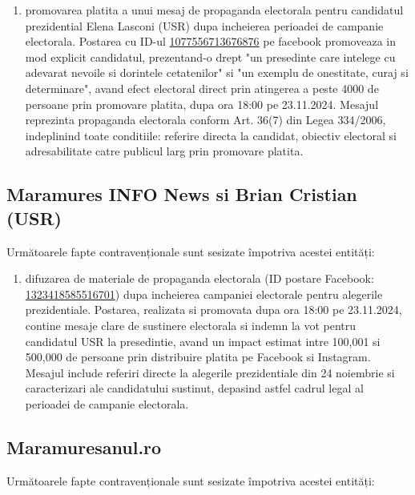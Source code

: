 \documentclass[a4paper,12pt]{article}
\begin{document}
\begin{enumerate}[leftmargin=*, label=\arabic*.)]
    \item promovarea platita a unui mesaj de propaganda electorala pentru candidatul prezidential Elena Lasconi (USR) dupa incheierea perioadei de campanie electorala. Postarea cu ID-ul \href{https://www.facebook.com/ads/library/?id=1077556713676876}{1077556713676876} pe facebook promoveaza in mod explicit candidatul, prezentand-o drept "un presedinte care intelege cu adevarat nevoile si dorintele cetatenilor" si "un exemplu de onestitate, curaj si determinare", avand efect electoral direct prin atingerea a peste 4000 de persoane prin promovare platita, dupa ora 18:00 pe 23.11.2024. Mesajul reprezinta propaganda electorala conform Art. 36(7) din Legea 334/2006, indeplinind toate conditiile: referire directa la candidat, obiectiv electoral si adresabilitate catre publicul larg prin promovare platita.
\end{enumerate}

\vspace{0.5cm}

\subsection{Maramures INFO News si Brian Cristian (USR)}
Următoarele fapte contravenționale sunt sesizate împotriva acestei entități:

\begin{enumerate}[leftmargin=*, label=\arabic*.)]
    \item difuzarea de materiale de propaganda electorala (ID postare Facebook: \href{https://www.facebook.com/ads/library/?id=1323418585516701}{1323418585516701}) dupa incheierea campaniei electorale pentru alegerile prezidentiale. Postarea, realizata si promovata dupa ora 18:00 pe 23.11.2024, contine mesaje clare de sustinere electorala si indemn la vot pentru candidatul USR la presedintie, avand un impact estimat intre 100,001 si 500,000 de persoane prin distribuire platita pe Facebook si Instagram. Mesajul include referiri directe la alegerile prezidentiale din 24 noiembrie si caracterizari ale candidatului sustinut, depasind astfel cadrul legal al perioadei de campanie electorala.
\end{enumerate}

\vspace{0.5cm}

\subsection{Maramuresanul.ro}
Următoarele fapte contravenționale sunt sesizate împotriva acestei entități:
\end{document}
